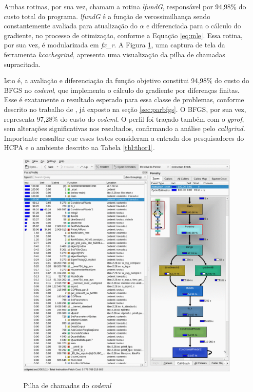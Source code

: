 \documentclass[cic,tc]{iiufrgs}
\begin{document}
Ambas rotinas, por sua vez, chamam a rotina \textit{lfundG}, responsável por
94,98\% do custo total do programa. \textit{lfundG} é a função de
verossimilhança sendo constantemente avaliada para atualização do $\alpha$ e
diferenciada para o cálculo do gradiente, no processo de otimização, conforme a
Equação \ref{eq:mle}. Essa rotina, por sua vez, é modularizada em
\textit{fx\_r}. A Figura \ref{fig:kcachegrind}, uma captura de tela da
ferramenta \textit{kcachegrind}, apresenta uma visualização da pilha de chamadas
supracitada.

Isto é, a avaliação e diferenciação da função objetivo constitui 94,98\% do
custo do BFGS no \textit{codeml}, que implementa o cálculo do gradiente por diferenças
finitas. Esse é exatamente o resultado esperado para essa classe de problemas,
conforme descrito no trabalho de \cite{byrd1988parallel}, já exposto na seção
\ref{sec:parbfgs}. O BFGS, por sua vez, representa 97,28\% do custo do \textit{codeml}.
O perfil foi traçado também com o \textit{gprof}, sem alterações significativas nos
resultados, confirmando a análise pelo \textit{callgrind}. Importante ressaltar que
esses testes consideram a entrada dos pesquisadores do HCPA e o ambiente
descrito na Tabela \ref{tbl:thor1}.

\begin{figure} \caption{Pilha de chamadas do \textit{codeml}} \begin{center}
\includegraphics[width=0.9\linewidth]{img/kcachegrind.png} \end{center}
 \label{fig:kcachegrind} \end{figure}
\end{document}
